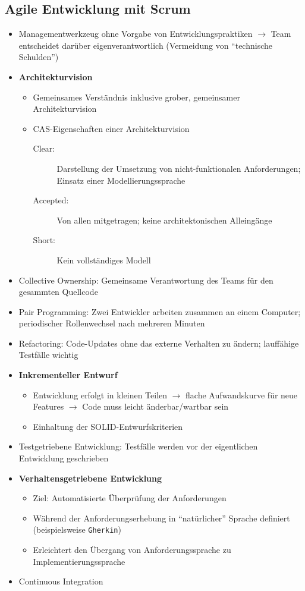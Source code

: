 \subsection{Agile Entwicklung mit Scrum}
\begin{itemize}
	\item Managementwerkzeug ohne Vorgabe von Entwicklungspraktiken \(\rightarrow\) Team entscheidet darüber eigenverantwortlich (Vermeidung von "`technische Schulden"')
	\item \textbf{Architekturvision}
	\begin{itemize}
		\item Gemeinsames Verständnis inklusive grober, gemeinsamer Architekturvision
		\item CAS-Eigenschaften einer Architekturvision
		\begin{description}
			\item[Clear:] Darstellung der Umsetzung von nicht-funktionalen Anforderungen; Einsatz einer Modellierungssprache
			\item[Accepted:] Von allen mitgetragen; keine architektonischen Alleingänge
			\item[Short:] Kein vollständiges Modell
		\end{description}
	\end{itemize}
	\item Collective Ownership: Gemeinsame Verantwortung des Teams für den gesammten Quellcode
	\item Pair Programming: Zwei Entwickler arbeiten zusammen an einem Computer; periodischer Rollenwechsel nach mehreren Minuten
	\item Refactoring: Code-Updates ohne das externe Verhalten zu ändern; lauffähige Testfälle wichtig
	\item \textbf{Inkrementeller Entwurf}
	\begin{itemize}
		\item Entwicklung erfolgt in kleinen Teilen \(\rightarrow\) flache Aufwandskurve für neue Features \(\rightarrow\) Code muss leicht änderbar/wartbar sein
		\item Einhaltung der SOLID-Entwurfskriterien
	\end{itemize}
	\item Testgetriebene Entwicklung: Testfälle werden vor der eigentlichen Entwicklung geschrieben
	\item \textbf{Verhaltensgetriebene Entwicklung}
	\begin{itemize}
		\item Ziel: Automatisierte Überprüfung der Anforderungen
		\item Während der Anforderungserhebung in "`natürlicher"' Sprache definiert (beispielsweise \texttt{Gherkin})
		\item Erleichtert den Übergang von Anforderungssprache zu Implementierungssprache
	\end{itemize}
	\item Continuous Integration
\end{itemize}



